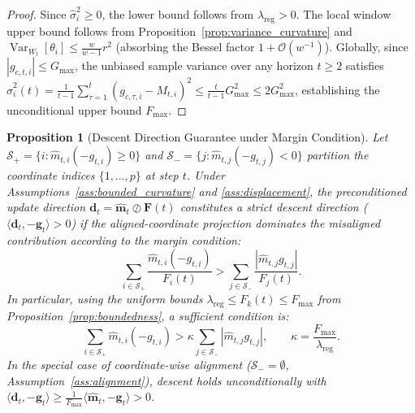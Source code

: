 \documentclass[11pt,a4paper]{article}
\newtheorem{proposition}{Proposition}
\begin{document}
\begin{proof}
Since $\hat{\sigma}_i^2 \ge 0$, the lower bound follows from $\lambda_{\text{reg}} > 0$. The local window upper bound follows from Proposition~\ref{prop:variance_curvature} and $\operatorname{Var}_{W_t}[\theta_i] \le \frac{w}{w-1} r^2$ (absorbing the Bessel factor $1 + \mathcal{O}(w^{-1})$). Globally, since $|g_{c,t,i}| \le G_{\max}$, the unbiased sample variance over any horizon $t \ge 2$ satisfies $\hat{\sigma}_i^2(t) = \frac{1}{t-1}\sum_{\tau=1}^t (g_{c,\tau,i} - M_{t,i})^2 \le \frac{t}{t-1} G_{\max}^2 \le 2 G_{\max}^2$, establishing the unconditional upper bound $F_{\max}$.
\end{proof}

\begin{proposition}[Descent Direction Guarantee under Margin Condition]
\label{prop:descent}
Let $\mathcal{S}_+ = \{i : \hat{m}_{t,i}(-g_{t,i}) \ge 0\}$ and $\mathcal{S}_- = \{j : \hat{m}_{t,j}(-g_{t,j}) < 0\}$ partition the coordinate indices $\{1, \dots, p\}$ at step $t$. Under Assumptions~\ref{ass:bounded_curvature} and \ref{ass:displacement}, the preconditioned update direction $\mathbf{d}_t = \hat{\mathbf{m}}_t \oslash \mathbf{F}(t)$ constitutes a strict descent direction ($\langle \mathbf{d}_t, -\mathbf{g}_t \rangle > 0$) if the aligned-coordinate projection dominates the misaligned contribution according to the margin condition:
\begin{equation}
\sum_{i \in \mathcal{S}_+} \frac{\hat{m}_{t,i} (-g_{t,i})}{F_i(t)} > \sum_{j \in \mathcal{S}_-} \frac{|\hat{m}_{t,j} g_{t,j}|}{F_j(t)}.
\label{eq:margin_condition}
\end{equation}
In particular, using the uniform bounds $\lambda_{\text{reg}} \le F_k(t) \le F_{\max}$ from Proposition~\ref{prop:boundedness}, a sufficient condition is:
\begin{equation}
\sum_{i \in \mathcal{S}_+} \hat{m}_{t,i} (-g_{t,i}) > \kappa \sum_{j \in \mathcal{S}_-} |\hat{m}_{t,j} g_{t,j}|, \qquad \kappa = \frac{F_{\max}}{\lambda_{\text{reg}}}.
\label{eq:kappa_margin}
\end{equation}
In the special case of coordinate-wise alignment ($\mathcal{S}_- = \emptyset$, Assumption~\ref{ass:alignment}), descent holds unconditionally with $\langle \mathbf{d}_t, -\mathbf{g}_t \rangle \ge \frac{1}{F_{\max}} \langle \hat{\mathbf{m}}_t, -\mathbf{g}_t \rangle > 0$.
\end{proposition}
\end{document}
